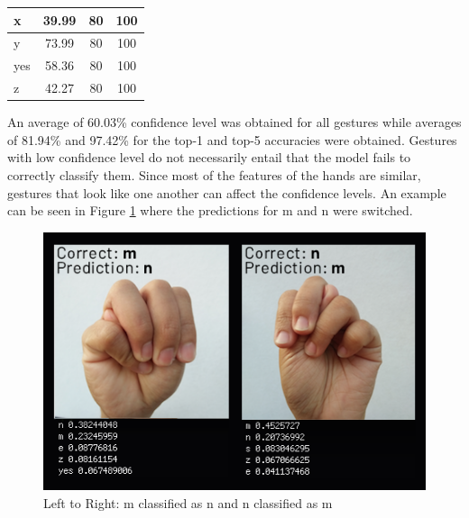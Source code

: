 \documentclass[journal]{./IEEE/IEEEtran}
\begin{document}
\begin{table}[ht!]
\begin{tabular}{|l|c|c|c|}
x                                      & 39.99                   & 80                      & 100                     \\ \hline
y                                      & 73.99                   & 80                      & 100                     \\ \hline
yes                                    & 58.36                   & 80                      & 100                     \\ \hline
z                                      & 42.27                   & 80                      & 100                     \\ \hline
\end{tabular}
\end{table}

\indent An average of 60.03\% confidence level was obtained for all gestures while averages of 81.94\% and 97.42\% for the top-1 and top-5 accuracies were obtained.
\newline
\indent Gestures with low confidence level do not necessarily entail that the model fails to correctly classify them. Since most of the features of the hands are similar, gestures that look like one another can affect the confidence levels. An example can be seen in Figure \ref{fig:wrong_results} where the predictions for m and n were switched. 

\begin{figure}[ht!]
    \centering
    \includegraphics[width=1\linewidth]{./images/wrong_results.png}
    \caption{Left to Right: m classified as n and n classified as m}
    \label{fig:wrong_results}
\end{figure}
\end{document}
